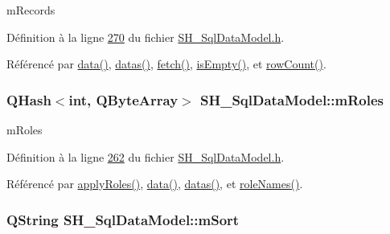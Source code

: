 m\-Records 



Définition à la ligne \hyperlink{SH__SqlDataModel_8h_source_l00270}{270} du fichier \hyperlink{SH__SqlDataModel_8h_source}{S\-H\-\_\-\-Sql\-Data\-Model.\-h}.



Référencé par \hyperlink{classSH__SqlDataModel_aa4664329d52c2d2cba2bacc42fa1a564}{data()}, \hyperlink{classSH__SqlDataModel_a24db284b370930b57e2261a7a72e2da8}{datas()}, \hyperlink{classSH__SqlDataModel_ab6c206088250a66ddc8cb8d33a38e421}{fetch()}, \hyperlink{classSH__SqlDataModel_ad85bfde0f7ffb06172eb5543e26d1331}{is\-Empty()}, et \hyperlink{classSH__SqlDataModel_a48d361600552aa4f80af693a68fc41dd}{row\-Count()}.

\hypertarget{classSH__SqlDataModel_ad1e46c72a6aeb83e3e7bb0c3110d12a4}{
\subsubsection[{m\-Roles}]{\setlength{\rightskip}{0pt plus 5cm}Q\-Hash$<$int, Q\-Byte\-Array$>$ S\-H\-\_\-\-Sql\-Data\-Model\-::m\-Roles\hspace{0.3cm}{\ttfamily [private]}}}\label{classSH__SqlDataModel_ad1e46c72a6aeb83e3e7bb0c3110d12a4}


m\-Roles 



Définition à la ligne \hyperlink{SH__SqlDataModel_8h_source_l00262}{262} du fichier \hyperlink{SH__SqlDataModel_8h_source}{S\-H\-\_\-\-Sql\-Data\-Model.\-h}.



Référencé par \hyperlink{classSH__SqlDataModel_ad4f032ceb7c2f70b2d7388e3afd161ab}{apply\-Roles()}, \hyperlink{classSH__SqlDataModel_aa4664329d52c2d2cba2bacc42fa1a564}{data()}, \hyperlink{classSH__SqlDataModel_a24db284b370930b57e2261a7a72e2da8}{datas()}, et \hyperlink{classSH__SqlDataModel_ac9954bbf92ed14566128c74318e3125b}{role\-Names()}.

\hypertarget{classSH__SqlDataModel_a7e36fd116b7cb50e949ee56af0c31772}{
\subsubsection[{m\-Sort}]{\setlength{\rightskip}{0pt plus 5cm}Q\-String S\-H\-\_\-\-Sql\-Data\-Model\-::m\-Sort\hspace{0.3cm}{\ttfamily [private]}}}\label{classSH__SqlDataModel_a7e36fd116b7cb50e949ee56af0c31772}



